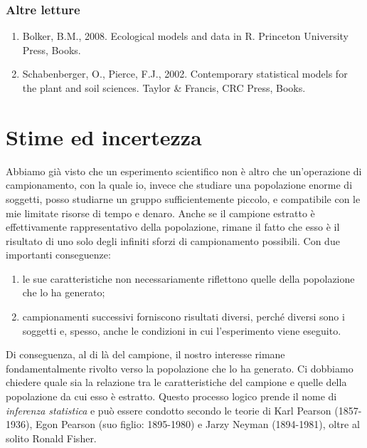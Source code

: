 \documentclass[a4paper,12pt,oneside]{book}
\providecommand{\tightlist}{%
  \setlength{\itemsep}{0pt}\setlength{\parskip}{0pt}}
\begin{document}
\hypertarget{altre-letture}{%
\subsection{Altre letture}\label{altre-letture}}

\begin{enumerate}
\def\labelenumi{\arabic{enumi}.}
\tightlist
\item
  Bolker, B.M., 2008. Ecological models and data in R. Princeton University Press, Books.
\item
  Schabenberger, O., Pierce, F.J., 2002. Contemporary statistical models for the plant and soil sciences. Taylor \& Francis, CRC Press, Books.
\end{enumerate}

\hypertarget{stime-ed-incertezza}{%
\chapter{Stime ed incertezza}\label{stime-ed-incertezza}}

Abbiamo già visto che un esperimento scientifico non è altro che un'operazione di campionamento, con la quale io, invece che studiare una popolazione enorme di soggetti, posso studiarne un gruppo sufficientemente piccolo, e compatibile con le mie limitate risorse di tempo e denaro. Anche se il campione estratto è effettivamente rappresentativo della popolazione, rimane il fatto che esso è il risultato di uno solo degli infiniti sforzi di campionamento possibili. Con due importanti conseguenze:

\begin{enumerate}
\def\labelenumi{\arabic{enumi}.}
\tightlist
\item
  le sue caratteristiche non necessariamente riflettono quelle della popolazione che lo ha generato;
\item
  campionamenti successivi forniscono risultati diversi, perché diversi sono i soggetti e, spesso, anche le condizioni in cui l'esperimento viene eseguito.
\end{enumerate}

Di conseguenza, al di là del campione, il nostro interesse rimane fondamentalmente rivolto verso la popolazione che lo ha generato. Ci dobbiamo chiedere quale sia la relazione tra le caratteristiche del campione e quelle della popolazione da cui esso è estratto. Questo processo logico prende il nome di \emph{inferenza statistica} e può essere condotto secondo le teorie di Karl Pearson (1857-1936), Egon Pearson (suo figlio: 1895-1980) e Jarzy Neyman (1894-1981), oltre al solito Ronald Fisher.
\end{document}

